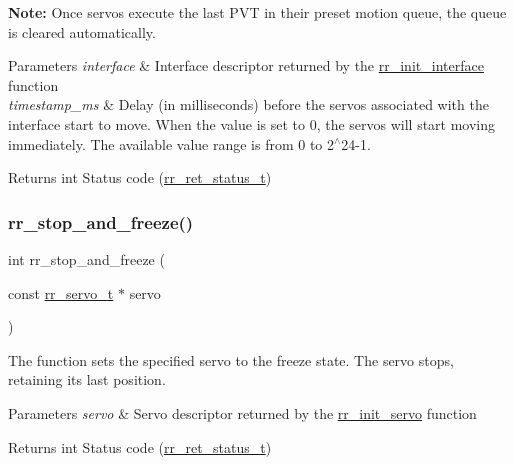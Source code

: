 {\bfseries Note\+:} Once servos execute the last P\+VT in their preset motion queue, the queue is cleared automatically.


\begin{DoxyParams}{Parameters}
{\em interface} & Interface descriptor returned by the \hyperlink{group___common_ga472a4890dcc7d7a13123c56a06946d91}{rr\+\_\+init\+\_\+interface} function \\
\hline
{\em timestamp\+\_\+ms} & Delay (in milliseconds) before the servos associated with the interface start to move. When the value is set to 0, the servos will start moving immediately. The available value range is from 0 to 2$^\wedge$24-\/1. \\
\hline
\end{DoxyParams}
\begin{DoxyReturn}{Returns}
int Status code (\hyperlink{api_8h_a92d5be5038abcf89837faf85a08debdc}{rr\+\_\+ret\+\_\+status\+\_\+t}) 
\end{DoxyReturn}
\mbox{\label{group___servo__control_gabc7b250aba6f86e29692957eac9ecb31}} 
\subsubsection{\texorpdfstring{rr\+\_\+stop\+\_\+and\+\_\+freeze()}{rr\_stop\_and\_freeze()}}
{\footnotesize\ttfamily int rr\+\_\+stop\+\_\+and\+\_\+freeze (\begin{DoxyParamCaption}\item[{const \hyperlink{structrr__servo__t}{rr\+\_\+servo\+\_\+t} $\ast$}]{servo }\end{DoxyParamCaption})}



The function sets the specified servo to the freeze state. The servo stops, retaining its last position. 


\begin{DoxyParams}{Parameters}
{\em servo} & Servo descriptor returned by the \hyperlink{group___common_ga0adb313a3eeb8a4399431e940a1f3e9e}{rr\+\_\+init\+\_\+servo} function \\
\hline
\end{DoxyParams}
\begin{DoxyReturn}{Returns}
int Status code (\hyperlink{api_8h_a92d5be5038abcf89837faf85a08debdc}{rr\+\_\+ret\+\_\+status\+\_\+t}) 
\end{DoxyReturn}
\mbox{\label{group___servo__control_ga4bc3f475fd951403fbd99e51dc3aba4a}} 
